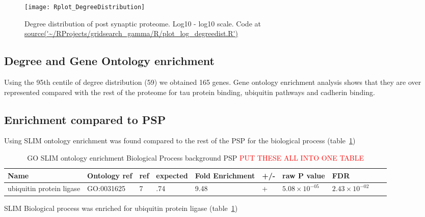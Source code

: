 \begin{figure}
    \texttt{[image: Rplot\_DegreeDistribution]}
    \caption{Degree distribution of post synaptic proteome. Log10 - log10 scale. Code at \url{source('~/RProjects/gridsearch_gamma/R/plot_log_degreedist.R') }}
    \label{fig:Degree distribution of post synaptic proteome. Log10 - log10 scale.}
\end{figure}

\subsection{Degree and Gene Ontology enrichment}

Using the 95th centile of degree distribution (59) we obtained 165 genes. Gene ontology enrichment analysis shows that they are over represented compared with the rest of the proteome for tau protein binding, ubiquitin pathways and cadherin binding.

\subsection{Enrichment compared to PSP}

Using SLIM ontology enrichment was found compared to the rest of the PSP for the biological process (table~\ref{tab:GO SLIM ontology enrichment Biological Process background PSP})

\begin{table}
\centering
\begin{adjustbox}{max width=\textwidth}
\begin{tabular}{llllllllll}
Name & Ontology ref &ref &	expected &	Fold Enrichment &	+/-	&raw P value&FDR\\
\hline
ubiquitin protein ligase & GO:0031625&  	7 &  	.74 & 	9.48 &  	+ & 	$5.08\times 10^{-05}$ & 	$2.43 \times 10^{-02}$\\
\end{tabular}
\end{adjustbox}
\caption{GO SLIM ontology enrichment Biological Process background PSP \textcolor{red}{PUT THESE ALL INTO ONE TABLE}}
\label{tab:GO SLIM ontology enrichment Biological Process background PSP}
\end{table}



SLIM Biological process was enriched for ubiquitin protein ligase (table~\ref{tab:GO SLIM ontology enrichment Biological Process background PSP})%






